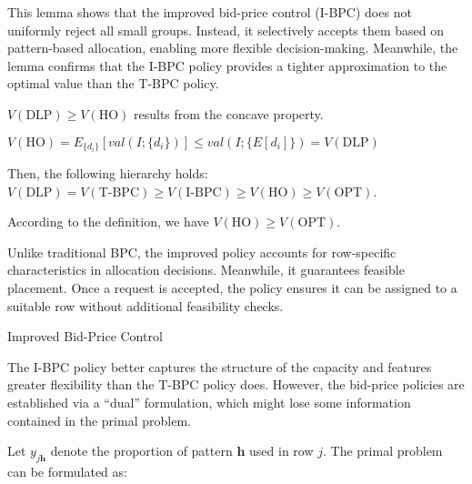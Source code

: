 
This lemma shows that the improved bid-price control (I-BPC) does not uniformly reject all small groups. Instead, it selectively accepts them based on pattern-based allocation, enabling more flexible decision-making. Meanwhile, the lemma confirms that the I-BPC policy provides a tighter approximation to the optimal value than the T-BPC policy.

\begin{lem}
$V(\text{DLP}) \geq V(\text{HO})$ results from the concave property. 
\end{lem}

$V(\text{HO}) = E_{\{d_{i}\}} [val(I; \{d_{i}\})] \leq val(I; \{E[d_{i}]\}) = V(\text{DLP})$

Then, the following hierarchy holds: $V(\text{DLP}) = V(\text{T-BPC}) \geq V(\text{I-BPC}) \geq V(\text{HO}) \geq V(\text{OPT})$. 

According to the definition, we have $V(\text{HO}) \geq V(\text{OPT})$.

Unlike traditional BPC, the improved policy accounts for row-specific characteristics in allocation decisions. Meanwhile, it guarantees feasible placement. Once a request is accepted, the policy ensures it can be assigned to a suitable row without additional feasibility checks.


\begin{algorithm}[H]
    \caption{Improved Bid-Price Control}\label{algo_improve_bid}
\end{algorithm}

The I-BPC policy better captures the structure of the capacity and features greater
flexibility than the T-BPC policy does. However, the bid-price policies are
established via a ``dual'' formulation, which might lose some information contained in the primal
problem.

Let $y_{j \bm{h}}$ denote the proportion of pattern $\bm{h}$ used in row $j$. The primal problem can be formulated as:

